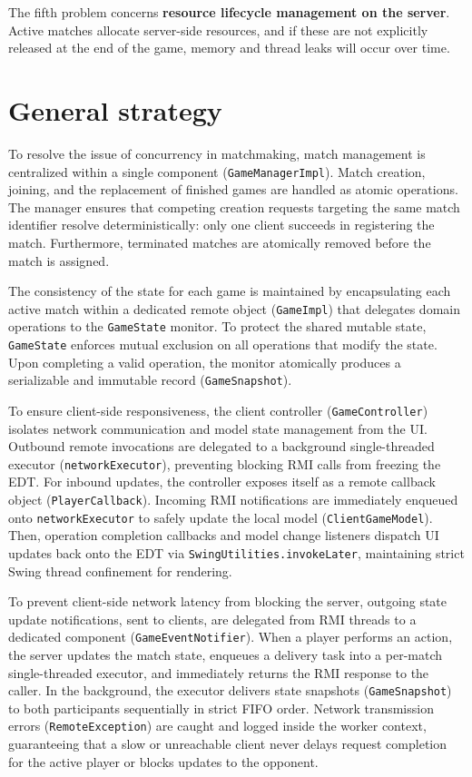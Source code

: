 \documentclass[11pt,a4paper]{article}
\begin{document}
The fifth problem concerns \textbf{resource lifecycle management on the server}. Active matches allocate server-side resources, and if these are not explicitly released at the end of the game, memory and thread leaks will occur over time.

\section{General strategy}

To resolve the issue of concurrency in matchmaking, match management is centralized within a single component (\texttt{GameManagerImpl}). Match creation, joining, and the replacement of finished games are handled as atomic operations. The manager ensures that competing creation requests targeting the same match identifier resolve deterministically: only one client succeeds in registering the match. Furthermore, terminated matches are atomically removed before the match is assigned.

The consistency of the state for each game is maintained by encapsulating each active match within a dedicated remote object (\texttt{GameImpl}) that delegates domain operations to the \texttt{GameState} monitor. To protect the shared mutable state, \texttt{GameState} enforces mutual exclusion on all operations that modify the state. Upon completing a valid operation, the monitor atomically produces a serializable and immutable record (\texttt{GameSnapshot}).

To ensure client-side responsiveness, the client controller (\texttt{GameController}) isolates network communication and model state management from the UI. Outbound remote invocations are delegated to a background single-threaded executor (\texttt{networkExecutor}), preventing blocking RMI calls from freezing the EDT. For inbound updates, the controller exposes itself as a remote callback object (\texttt{PlayerCallback}). Incoming RMI notifications are immediately enqueued onto \texttt{networkExecutor} to safely update the local model (\texttt{ClientGameModel}). Then, operation completion callbacks and model change listeners dispatch UI updates back onto the EDT via \texttt{SwingUtilities.invokeLater}, maintaining strict Swing thread confinement for rendering.

To prevent client-side network latency from blocking the server, outgoing state update notifications, sent to clients, are delegated from RMI threads to a dedicated component (\texttt{GameEventNotifier}). When a player performs an action, the server updates the match state, enqueues a delivery task into a per-match single-threaded executor, and immediately returns the RMI response to the caller. In the background, the executor delivers state snapshots (\texttt{GameSnapshot}) to both participants sequentially in strict FIFO order. Network transmission errors (\texttt{RemoteException}) are caught and logged inside the worker context, guaranteeing that a slow or unreachable client never delays request completion for the active player or blocks updates to the opponent.
\end{document}
